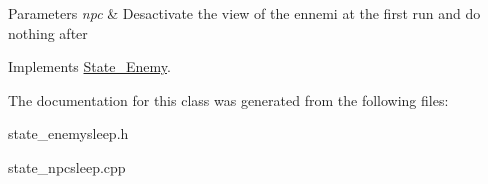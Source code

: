 \begin{DoxyParams}{Parameters}
{\em npc} & Desactivate the view of the ennemi at the first run and do nothing after \\
\hline
\end{DoxyParams}


Implements \hyperlink{class_state___enemy_a5f55ff045d530b5fda0b976a0b83d71a}{State\+\_\+\+Enemy}.



The documentation for this class was generated from the following files\+:\begin{DoxyCompactItemize}
\item 
state\+\_\+enemysleep.\+h\item 
state\+\_\+npcsleep.\+cpp\end{DoxyCompactItemize}
